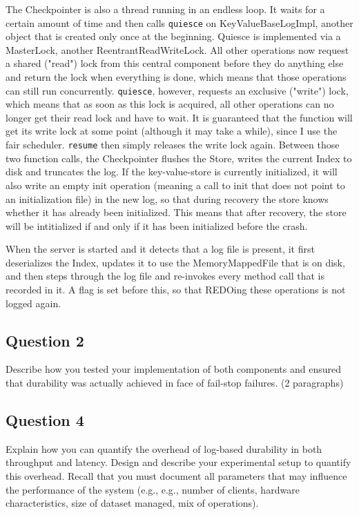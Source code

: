 \documentclass[12pt,a4paper]{article}
\begin{document}
The Checkpointer is also a thread running in an endless loop. It waits for a certain amount of time and then calls \texttt{quiesce} on KeyValueBaseLogImpl, another object that is created only once at the beginning. Quiesce is implemented via a MasterLock, another ReentrantReadWriteLock. All other operations now request a shared ("read") lock from this central component before they do anything else and return the lock when everything is done, which means that those operations can still run concurrently. \texttt{quiesce}, however, requests an exclusive ("write") lock, which means that as soon as this lock is acquired, all other operations can no longer get their read lock and have to wait. It is guaranteed that the function will get its write lock at some point (although it may take a while), since I use the fair scheduler. \texttt{resume} then simply releases the write lock again. Between those two function calls, the Checkpointer flushes the Store, writes the current Index to disk and truncates the log. If the key-value-store is currently initialized, it will also write an empty init operation (meaning a call to init that does not point to an initialization file) in the new log, so that during recovery the store knows whether it has already been initialized. This means that after recovery, the store will be intitialized if and only if it has been initialized before the crash.

When the server is started and it detects that a log file is present, it first deserializes the Index, updates it to use the MemoryMappedFile that is on disk, and then steps through the log file and re-invokes every method call that is recorded in it. A flag is set before this, so that REDOing these operations is not logged again.


\subsection*{Question 2}
\label{sec:pq2}
Describe how you tested your implementation of both components and ensured that
durability was actually achieved in face of fail-stop failures. (2 paragraphs)


\subsection*{Question 4}
\label{sec:pq4}
Explain how you can quantify the overhead of log-based durability in both throughput and
latency. Design and describe your experimental setup to quantify this overhead. Recall that you must
document all parameters that may influence the performance of the system (e.g., e.g., number of clients,
hardware characteristics, size of dataset managed, mix of operations).
\end{document}
